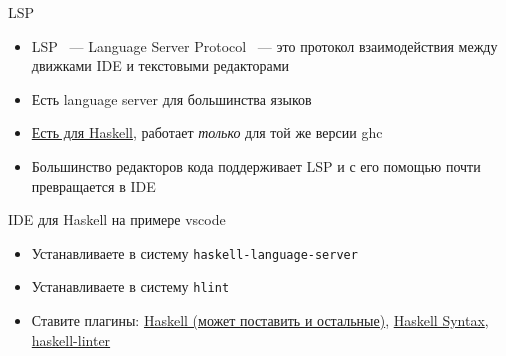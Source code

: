     \begin{frame}{LSP}
        \begin{itemize}
            \item LSP ~--- Language Server Protocol ~--- это протокол взаимодействия между движками IDE и текстовыми редакторами
            \item Есть language server для большинства языков
            \item \href{https://github.com/haskell/haskell-language-server/releases}{\color{blue}Есть для Haskell}, работает \emph{только} для той же версии ghc
            \item Большинство редакторов кода поддерживает LSP и с его помощью почти превращается в IDE
        \end{itemize}
        \begin{block}{IDE для Haskell на примере vscode}
            \begin{itemize}
                \item Устанавливаете в систему \texttt{haskell-language-server}
                \item Устанавливаете в систему \texttt{hlint}
                \item Ставите плагины: \href{https://marketplace.visualstudio.com/items?itemName=haskell.haskell}{\color{blue} Haskell (может поставить и остальные)}, \href{https://marketplace.visualstudio.com/items?itemName=justusadam.language-haskell}{\color{blue} Haskell Syntax},
                \href{https://marketplace.visualstudio.com/items?itemName=hoovercj.haskell-linter}{\color{blue} haskell-linter}
            \end{itemize}
        \end{block}
    \end{frame}


    \appendix

